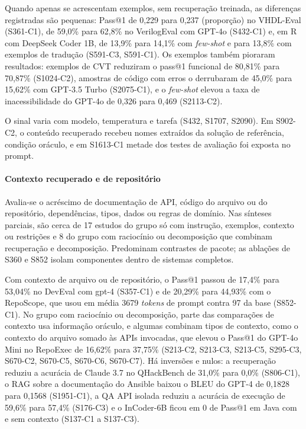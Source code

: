 Quando apenas se acrescentam exemplos, sem recuperação treinada, as diferenças registradas são pequenas: Pass@1 de 0,229 para 0,237 (proporção) no VHDL-Eval (S361-C1), de 59,0\% para 62,8\% no VerilogEval com GPT-4o (S432-C1) e, em R com DeepSeek Coder 1B, de 13,9\% para 14,1\% com \textit{few-shot} e para 13,8\% com exemplos de tradução (S591-C3, S591-C1).
Os exemplos também pioraram resultados: exemplos de CVT reduziram o pass@1 funcional de 80,81\% para 70,87\% (S1024-C2), amostras de código com erros o derrubaram de 45,0\% para 15,62\% com GPT-3.5 Turbo (S2075-C1), e o \textit{few-shot} elevou a taxa de inacessibilidade do GPT-4o de 0,326 para 0,469 (S2113-C2).

O sinal varia com modelo, temperatura e tarefa (S432, S1707, S2090). Em S902-C2, o conteúdo recuperado recebeu nomes extraídos da solução de referência, condição oráculo, e em S1613-C1 metade dos testes de avaliação foi exposta no prompt.

\paragraph{Contexto recuperado e de repositório}
Avalia-se o acréscimo de documentação de API, código do arquivo ou do repositório, dependências, tipos, dados ou regras de domínio. Nas sínteses parciais, são cerca de 17 estudos do grupo só com instrução, exemplos, contexto ou restrições e 8 do grupo com raciocínio ou decomposição que combinam recuperação e decomposição. Predominam contrastes de pacote; as ablações de S360 e S852 isolam componentes dentro de sistemas completos.

Com contexto de arquivo ou de repositório, o Pass@1 passou de 17,4\% para 53,04\% no DevEval com gpt-4 (S357-C1) e de 20,29\% para 44,93\% com o RepoScope, que usou em média 3679 \textit{tokens} de prompt contra 97 da base (S852-C1).
No grupo com raciocínio ou decomposição, parte das comparações de contexto usa informação oráculo, e algumas combinam tipos de contexto, como o contexto do arquivo somado às APIs invocadas, que elevou o Pass@1 do GPT-4o Mini no RepoExec de 16,62\% para 37,75\% (S213-C2, S213-C3, S213-C5, S295-C3, S670-C2, S670-C5, S670-C6, S670-C7).
Há inversões e nulos: a recuperação reduziu a acurácia de Claude 3.7 no QHackBench de 31,0\% para 0,0\% (S806-C1), o RAG sobre a documentação do Ansible baixou o BLEU do GPT-4 de 0,1828 para 0,1568 (S1951-C1), a QA API isolada reduziu a acurácia de execução de 59,6\% para 57,4\% (S176-C3) e o InCoder-6B ficou em 0 de Pass@1 em Java com e sem contexto (S137-C1 a S137-C3).


